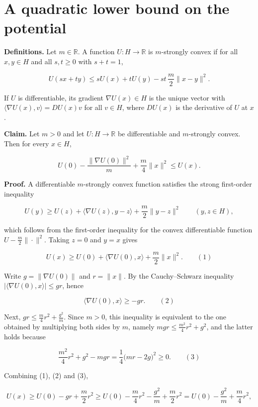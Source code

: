 \documentclass[11pt,a4paper]{article}
\begin{document}
\section{\texorpdfstring{A quadratic lower bound on the potential}{A quadratic lower bound on the potential}}


\textbf{Definitions.} Let \(m\in\mathbb R\). A function \(U:H\to\mathbb R\) is \(m\)-strongly convex if for all \(x,y\in H\) and all \(s,t\ge0\) with \(s+t=1\),


\[U(sx+ty)\le sU(x)+tU(y)-st\,\frac m2\|x-y\|^2.\]


If \(U\) is differentiable, its gradient \(\nabla U(x)\in H\) is the unique vector with \(\langle\nabla U(x),v\rangle=DU(x)v\) for all \(v\in H\), where \(DU(x)\) is the derivative of \(U\) at \(x\).




\textbf{Claim.} Let \(m>0\) and let \(U:H\to\mathbb R\) be differentiable and \(m\)-strongly convex. Then for every \(x\in H\),


\[U(0)-\frac{\|\nabla U(0)\|^2}{m}+\frac m4\|x\|^2\le U(x).\]


\textbf{Proof.} A differentiable \(m\)-strongly convex function satisfies the strong first-order inequality \cite[Section~3.2.2]{LangevinLean2026ULASC}


\[U(y)\ge U(z)+\langle\nabla U(z),y-z\rangle+\frac m2\|y-z\|^2\qquad(y,z\in H),\]


which follows from the first-order inequality for the convex differentiable function \(U-\frac m2\|\cdot\|^2\). Taking \(z=0\) and \(y=x\) gives


\[U(x)\ge U(0)+\langle\nabla U(0),x\rangle+\frac m2\|x\|^2.\qquad(1)\]


Write \(g=\|\nabla U(0)\|\) and \(r=\|x\|\). By the Cauchy–Schwarz inequality \(|\langle\nabla U(0),x\rangle|\le gr\), hence


\[\langle\nabla U(0),x\rangle\ge-gr.\qquad(2)\]


Next, \(gr\le\frac m4r^2+\frac{g^2}m\). Since \(m>0\), this inequality is equivalent to the one obtained by multiplying both sides by \(m\), namely \(mgr\le\frac{m^2}4r^2+g^2\), and the latter holds because


\[\frac{m^2}{4}r^2+g^2-mgr=\frac14\bigl(mr-2g\bigr)^2\ge0.\qquad(3)\]


Combining (1), (2) and (3),


\[U(x)\ge U(0)-gr+\frac m2r^2\ge U(0)-\frac m4r^2-\frac{g^2}m+\frac m2r^2=U(0)-\frac{g^2}m+\frac m4r^2,\]
\end{document}
